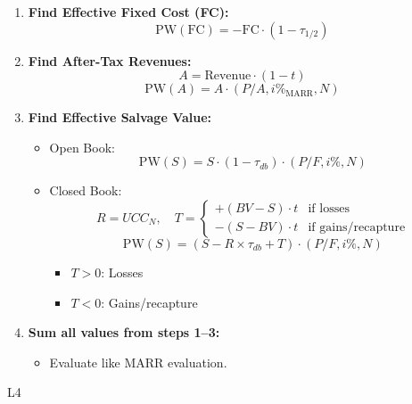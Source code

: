 \begin{process}
    \begin{enumerate}
        \item \textbf{Find Effective Fixed Cost (FC):}
        \begin{equation}
            \text{PW}(\text{FC}) = - \text{FC} \cdot (1 - \tau_{1/2})
        \end{equation}
    
        \item \textbf{Find After-Tax Revenues:}
        \begin{equation}
            A = \text{Revenue} \cdot (1 - t)
        \end{equation}
        \begin{equation}
            \text{PW}(A) = A \cdot (P/A, i\%_{\text{MARR}}, N)
        \end{equation}
    
        \item \textbf{Find Effective Salvage Value:}
        \begin{itemize}
            \item Open Book:
            \begin{equation}
                \text{PW}(S) = S \cdot (1 - \tau_{db}) \cdot (P/F, i\%, N)
            \end{equation}
            \item Closed Book:
            \begin{equation}
                R = UCC_N, \quad T = \begin{cases} 
                +(BV-S) \cdot t & \text{if losses} \\
                -(S-BV) \cdot t & \text{if gains/recapture}
                \end{cases}
            \end{equation}
            \begin{equation}
                \text{PW}(S) = (S - R \times \tau_{db} + T) \cdot (P/F, i\%, N)
            \end{equation}
            \begin{itemize}
                \item \(T>0\): Losses
                \item \(T<0\): Gains/recapture 
            \end{itemize}
        \end{itemize}
    
        \item \textbf{Sum all values from steps 1--3:}
        \begin{itemize}
            \item Evaluate like MARR evaluation.
        \end{itemize}
    \end{enumerate}
\end{process}

\begin{example}
    L4
\end{example}